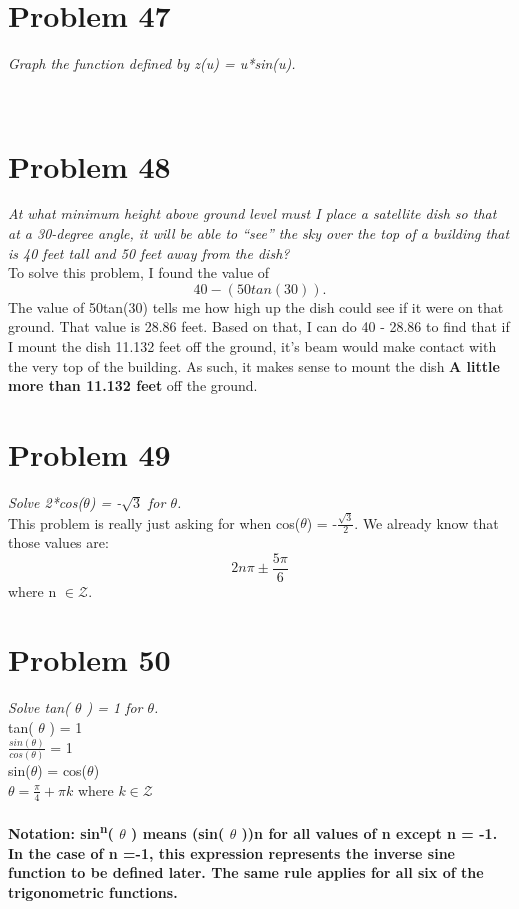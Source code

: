 \documentclass[11pt]{article} %
\newcommand\tab[1][1cm]{\hspace*{#1}}
\begin{document}
{\section{Problem 47}
\textit{Graph the function defined by z(u) = u*sin(u).}
\\ \\

\section{Problem 48}
\textit{At what minimum height above ground level must I place a satellite dish so that at a 30-degree angle, it will be able to ``see'' the sky over the top of a building that is 40 feet tall and 50 feet away from the dish?}
\\ \tab To solve this problem, I found the value of
            \begin{equation} 40 - (50tan(30)).  \end{equation}
The value of 50tan(30) tells me how high up the dish could see if it were on that ground. That value is 28.86 feet. Based on that, I can do 40  - 28.86 to find that if I mount the dish 11.132 feet off the ground, it's beam would make contact with the very top of the building. As such, it makes sense to mount the dish \textbf{A little more than 11.132 feet} off the ground.


\section{Problem 49}
\textit{Solve 2*cos($\theta$) = -$\sqrt{3}$ for $\theta$.}
\\ \tab This problem is really just asking for when cos($\theta$) = -$\frac{\sqrt{3}}{2}$. We already know that those values are:
\begin{equation}  2n\pi \pm \frac{5\pi}{6} \end{equation}
where n $\in \mathcal{Z}$. 

\section{Problem 50}
\textit{Solve tan( $\theta$ ) = 1 for $\theta$.}
\\ tan( $\theta$ ) = 1
\\ $\frac{sin(\theta)}{cos(\theta)}$ = 1
\\ sin($\theta$) = cos($\theta$)
\\ $\theta = \frac{\pi}{4}+\pi k$ where $k \in \mathcal{Z}$
\\
\\
\tab \textbf{Notation: sin\textsuperscript{n}( $\theta$ ) means (sin( $\theta$ ))n for all values of n except n = -1. In the case of n =-1, this expression represents the inverse sine function to be defined later. The same rule applies for all six of the trigonometric functions.}

}
\end{document}
